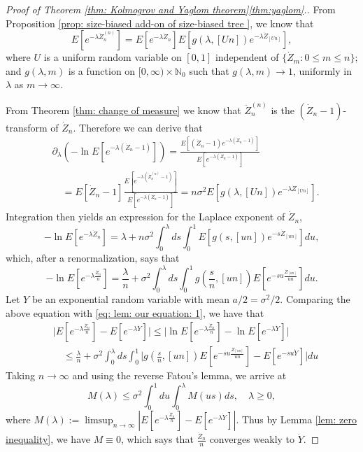 \documentclass[12pt,a4paper]{amsart}
\numberwithin{equation}{section}
\begin{document}
\begin{proof}[Proof of Theorem \ref{thm: Kolmogrov and Yaglom theorem}\eqref{thm:yaglom}.]
	From Proposition \ref{prop: size-biased add-on of size-biased tree }, we know that
	\[
	E [ e^{- \lambda \ddot Z_n^{(n)}} ]
	= E [e^{-\lambda \dot Z_n}] E[g(\lambda, [Un])e^{-\lambda \dot Z_{[Un]}}],
	\]
where $U$ is a uniform  random variable on $[0,1]$ independent of $\{\dot Z_m: 0\le m\le n\}$;
	and $g(\lambda, m)$ is a function on $[0,\infty) \times \mathbb N_0$ such that
	$g(\lambda, m) \to 1$, uniformly in $\lambda$ as $m\to \infty$.
	
	From Theorem \ref{thm: change of measure} we know that $\ddot Z_n^{(n)}$ is the $(\dot Z_n - 1)$-transform of $\dot Z_n$.
	Therefore we can derive that
\[\begin{split}
	&\partial_\lambda (-\ln E[e^{-\lambda (\dot Z_n-1)}])
	= \frac{E[(\dot Z_n-1) e^{-\lambda (\dot Z_n-1)}]}{E[e^{-\lambda (\dot Z_n-1)}]}
	\\&\quad = E[\dot Z_n - 1] \frac{E[ e^{-\lambda (\ddot Z^{(n)}_n-1)}]}{E[e^{-\lambda (\dot Z_n-1)}]}
	= n\sigma^2 E[g(\lambda, [Un])e^{-\lambda \dot Z_{[Un]}}].
\end{split}\]
	Integration then yields an expression for the Laplace exponent of $\dot Z_n$,
\[
	- \ln E[ e^{- \lambda \dot Z_n}]
	= \lambda + n \sigma^2 \int_0^\lambda ds \int_0^1 E[g(s, [un]) e^{-s \dot Z_{[un]}}] du,
\]
	which, after a renormalization, says that
\[
	- \ln E[ e^{- \lambda \frac{\dot Z_n}{n}}]
	= \frac{\lambda}{n} + \sigma^2 \int_0^\lambda ds \int_0^1 g(\frac{s}{n}, [un]) E[e^{-su \frac{\dot Z_{[un]}}{un}}] du.
\]
	Let $Y$ be an exponential random variable with mean 
	$a/2=\sigma^2/2$.
	Comparing the above equation with \eqref{eq: lem: our equation: 1}, we have that
\[\begin{split}
	&\big| E[e^{-\lambda \frac{\dot Z_n}{n}}] - E[e^{-\lambda \dot Y}]\big| 
	\leq \big| \ln E[e^{-\lambda \frac{\dot Z_n}{n}}] - \ln E[e^{-\lambda \dot Y}]\big| 
	\\&\quad \leq \frac{\lambda }{n} + \sigma^2 \int_0^\lambda ds \int_0^1 \big| g(\frac{s}{n}, [un]) E[e^{-su \frac { Z_{[un]} } {un} }] - E[e^{- su \dot Y}]\big| du 
\end{split}\]
Taking $n\to \infty$ and using the reverse Fatou's lemma, we arrive at
\[
	M(\lambda)
	\leq \sigma^2 \int_0^1du \int_0^\lambda M(us)ds,
	\quad \lambda\geq 0,
\]
	where 
$M(\lambda) := \limsup_{n\to \infty} | E[ e^{- \lambda \frac{\dot Z_n }{n}}] - E[e^{-\lambda \dot Y}]|$. 
	Thus by Lemma \ref{lem: zero inequality}, we have $M \equiv 0$, which says that 
	$\frac{\dot Z_n}{n}$ converges weakly to $\dot Y$.


\end{proof}
\end{document}
